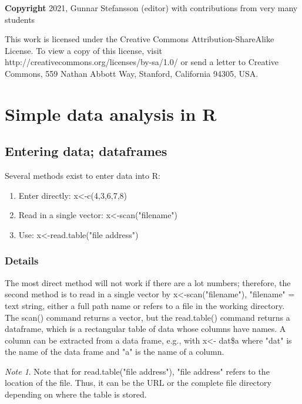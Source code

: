\documentclass[12pt,a4paper]{article}
\theoremstyle{regla}
\theoremstyle{remark}
\newtheorem{notes}{Note}[section]
\theoremstyle{definition}
\theoremstyle{nonumberbreak}
\begin{document}
{\bf Copyright}
2021, Gunnar Stefansson (editor) with contributions from very many students

This work is licensed under the Creative Commons
Attribution-ShareAlike License. To view a copy of this license, visit
http://creativecommons.org/licenses/by-sa/1.0/ or send a letter to
Creative Commons, 559 Nathan Abbott Way, Stanford, California 94305,
USA.
\clearpage
\section{Simple data analysis in R}
\subsection{Entering data; dataframes}
\begin{fbox}
\begin{minipage}{0.97\textwidth}
Several methods exist to enter data into R:

\begin{enumerate}
	\item Enter directly: x<-c(4,3,6,7,8)
	\item Read in a single vector: x<-scan("filename")
	\item Use: x<-read.table("file address")
\end{enumerate}
\end{minipage}
\end{fbox}
\subsubsection{Details}
The most direct method will not work if there are a lot numbers; therefore, the second method is to read in a single vector by x<-scan("filename"), "filename" = text string, either a full path name or refers to a file in the working directory.\\

The scan() command returns a vector, but the read.table() command returns a dataframe, which is a rectangular table of data whose columns have names.  A column can be extracted from a data frame, e.g., with x<- dat\$a where "dat" is the name of the data frame and "a" is the name of a column.

\begin{notes}
Note that for read.table("file address"), "file address" refers to the location of the file.  Thus, it can be the URL or the complete file directory depending on where the table is stored.
\end{notes}
\end{document}
